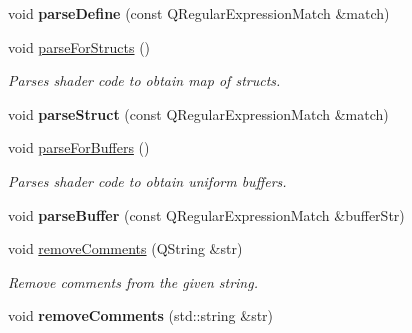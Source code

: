 \begin{Indent}
\begin{DoxyCompactItemize}
\mbox{\label{classrev_1_1_shader_a65e4bd9dccc5ddca3cdca9e873e6ae57}} 
void {\bfseries parse\+Define} (const Q\+Regular\+Expression\+Match \&match)
\item 
\mbox{\label{classrev_1_1_shader_a2180cef750ec9a1c16ab514c98842cfb}} 
void \mbox{\hyperlink{classrev_1_1_shader_a2180cef750ec9a1c16ab514c98842cfb}{parse\+For\+Structs}} ()
\begin{DoxyCompactList}\small\item\em Parses shader code to obtain map of structs. \end{DoxyCompactList}\item 
\mbox{\label{classrev_1_1_shader_a490fbed793dc553d6359a4bf9355912e}} 
void {\bfseries parse\+Struct} (const Q\+Regular\+Expression\+Match \&match)
\item 
\mbox{\label{classrev_1_1_shader_a863e858b220a3ea3667715d6e384c9dd}} 
void \mbox{\hyperlink{classrev_1_1_shader_a863e858b220a3ea3667715d6e384c9dd}{parse\+For\+Buffers}} ()
\begin{DoxyCompactList}\small\item\em Parses shader code to obtain uniform buffers. \end{DoxyCompactList}\item 
\mbox{\label{classrev_1_1_shader_a3ddab68f480512c8db286aaa395b648a}} 
void {\bfseries parse\+Buffer} (const Q\+Regular\+Expression\+Match \&buffer\+Str)
\item 
\mbox{\label{classrev_1_1_shader_a6e10f3568aa5a0bc498b2a73624eb9df}} 
void \mbox{\hyperlink{classrev_1_1_shader_a6e10f3568aa5a0bc498b2a73624eb9df}{remove\+Comments}} (Q\+String \&str)
\begin{DoxyCompactList}\small\item\em Remove comments from the given string. \end{DoxyCompactList}\item 
\mbox{\label{classrev_1_1_shader_acf463c68d76e59fece549a95582c3bb1}} 
void {\bfseries remove\+Comments} (std\+::string \&str)
\end{DoxyCompactItemize}
\end{Indent}
